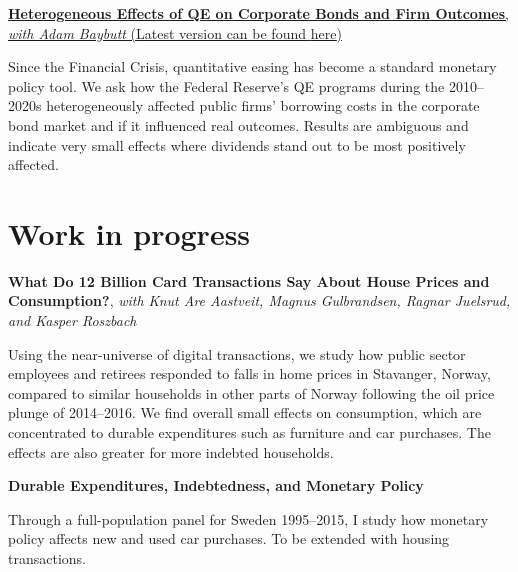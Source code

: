 \documentclass{clean_cv}
\newcommand{\datetabspace}{4.5em}
\begin{document}
\medskip

\href{http://www.adambaybutt.org/uploads/1/2/4/9/124972193/baybutt_bojeryd-2021-qe_and_firms.pdf}{\textbf{Heterogeneous Effects of QE on Corporate Bonds and Firm Outcomes}, \emph{with Adam Baybutt} (\href{http://www.adambaybutt.org/uploads/1/2/4/9/124972193/baybutt_bojeryd-2021-qe_and_firms.pdf}{Latest version can be found \underline{here}})}

Since the Financial Crisis, quantitative easing has become a standard monetary policy tool. We ask how the Federal Reserve's QE programs during the 2010--2020s heterogeneously affected public firms' borrowing costs in the corporate bond market and if it influenced real outcomes. Results are ambiguous and indicate very small effects where dividends stand out to be most positively affected.


\section{Work in progress}




\textbf{What Do 12 Billion Card Transactions Say About House Prices and Consumption?}, \emph{with Knut Are Aastveit, Magnus Gulbrandsen, Ragnar Juelsrud, and Kasper Roszbach}

Using the near-universe of digital transactions, we study how public sector employees and retirees responded to falls in home prices in Stavanger, Norway, compared to similar households in other parts of Norway following the oil price plunge of 2014--2016. We find overall small effects on consumption, which are concentrated to durable expenditures such as furniture and car purchases. The effects are also greater for more indebted households.

\medskip

\textbf{Durable Expenditures, Indebtedness, and Monetary Policy}

Through a full-population panel for Sweden 1995--2015, I study how monetary policy affects new and used car purchases. To be extended with housing transactions.

\iffalse
\section{Research papers}
\nocite{*}%
\highlightauthorname{Jesper}{J}{Bojeryd} 
\begin{datetabular}{\datetabspace}
\dateentry{2021}{\printbibyear{2021}}
\dateentry{2015}{\printbibyear{2015}}
\end{datetabular}
\fi
\end{document}
